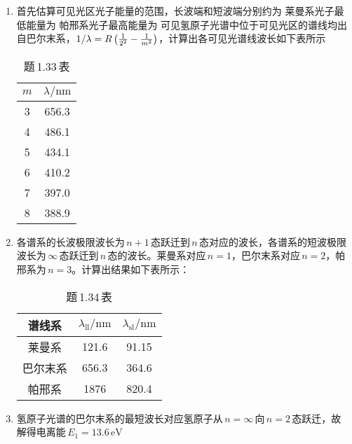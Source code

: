 \begin{enumerate}[label=1.\arabic*, leftmargin=-0.5mm]
\item
首先估算可见光区光子能量的范围，长波端和短波端分别约为
莱曼系光子最低能量为
帕邢系光子最高能量为
可见氢原子光谱中位于可见光区的谱线均出自巴尔末系，$1/\lambda=R\left(\frac{1}{2^2}-\frac{1}{m^2}\right)$，计算出各可见光谱线波长如下表所示
\begin{table}[h]
    \centering
    \begin{tabular}{c|c}
    \hline
        \rule{0pt}{13pt}$m$ & $\lambda/\mathrm{nm}$\\
        \hline
        \rule{0pt}{13pt}3 & 656.3 \\
        \rule{0pt}{13pt}4 & 486.1 \\
        \rule{0pt}{13pt}5 & 434.1 \\
        \rule{0pt}{13pt}6 & 410.2 \\
        \rule{0pt}{13pt}7 & 397.0 \\
        \rule{0pt}{13pt}8 & 388.9 \\
    \hline
    \end{tabular}
    \caption{题\,1.33\,表}
\end{table}

\item
各谱系的长波极限波长为$\,n+1\,$态跃迁到$\,n\,$态对应的波长，各谱系的短波极限波长为$\,\infty\,$态跃迁到$\,n\,$态的波长。莱曼系对应$\,n=1$，巴尔末系对应$\,n=2$，帕邢系为$\,n=3$。计算出结果如下表所示：
\begin{table}[h]
    \centering
    \begin{tabular}{c|c|c}
    \hline
        \rule{0pt}{13pt}谱线系 & $\lambda_\mathrm{ll}/\mathrm{nm}$ & $\lambda_\mathrm{sl}/\mathrm{nm}$ \\
        \hline
        \rule{0pt}{13pt}莱曼系 & 121.6 & 91.15 \\
        \rule{0pt}{13pt}巴尔末系 & 656.3 & 364.6 \\
        \rule{0pt}{13pt}帕邢系 & 1876 & 820.4 \\
    \hline
    \end{tabular}
    \caption{题\,1.34\,表}
\end{table}

\item
氢原子光谱的巴尔末系的最短波长对应氢原子从$\,n=\infty\,$向$\,n=2\,$态跃迁，故
解得电离能$\,E_1=13.6\,\mathrm{eV}$


\end{enumerate}

